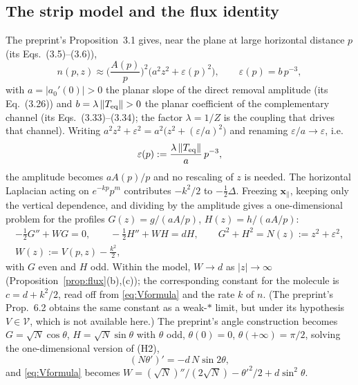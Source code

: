 \documentclass[11pt,a4paper]{article}
\theoremstyle{plain}
\theoremstyle{definition}
\theoremstyle{remark}
\newcommand{\VV}{\mathcal{V}}
\newcommand{\norm}[1]{\left\|#1\right\|}
\begin{document}
\subsection{The strip model and the flux identity}
The preprint's Proposition~3.1 gives, near the plane at large horizontal distance $p$ (its Eqs.~(3.5)--(3.6)),
\[
n(p,z)\approx\Big(\frac{A(p)}{p}\Big)^2\big(a^2z^2+\varepsilon(p)^2\big),\qquad \varepsilon(p)=b\,p^{-3},
\]
with $a=|a_0'(0)|>0$ the planar slope of the direct removal amplitude (its Eq.~(3.26)) and $b=\lambda\norm{T_{\rm eq}}>0$ the planar coefficient of the complementary channel (its Eqs.~(3.33)--(3.34); the factor $\lambda=1/Z$ is the coupling that drives that channel). Writing $a^2z^2+\varepsilon^2=a^2\big(z^2+(\varepsilon/a)^2\big)$ and renaming $\varepsilon/a\to\varepsilon$, i.e.
\[
\varepsilon(p):=\frac{\lambda\norm{T_{\rm eq}}}{a}\,p^{-3},
\]
the amplitude becomes $aA(p)/p$ and no rescaling of $z$ is needed. The horizontal Laplacian acting on $e^{-kp}p^m$ contributes $-k^2/2$ to $-\tfrac12\Delta$. Freezing $\mathbf x_\parallel$, keeping only the vertical dependence, and dividing by the amplitude gives a one-dimensional problem for the profiles $G(z)=g/(aA/p)$, $H(z)=h/(aA/p)$:
\begin{equation}\label{eq:strip}
\begin{gathered}
-\tfrac12G''+WG=0,\qquad -\tfrac12H''+WH=dH,\qquad G^2+H^2=N(z):=z^2+\varepsilon^2,\\
W(z):=V(p,z)-\tfrac{k^2}{2},
\end{gathered}
\end{equation}
with $G$ even and $H$ odd. Within the model, $W\to d$ as $|z|\to\infty$ (Proposition~\ref{prop:flux}(b),(c)); the corresponding constant for the molecule is $c=d+k^2/2$, read off from \eqref{eq:Vformula} and the rate $k$ of $n$. (The preprint's Prop.~6.2 obtains the same constant as a weak-$*$ limit, but under its hypothesis $V\in\VV$, which is not available here.) The preprint's angle construction becomes $G=\sqrt N\cos\theta$, $H=\sqrt N\sin\theta$ with $\theta$ odd, $\theta(0)=0$, $\theta(+\infty)=\pi/2$, solving the one-dimensional version of (H2),
\begin{equation}\label{eq:angle1d}
(N\theta')'=-d\,N\sin 2\theta ,
\end{equation}
and \eqref{eq:Vformula} becomes $W=(\sqrt N)''/(2\sqrt N)-\theta'^2/2+d\sin^2\theta$.
\end{document}
